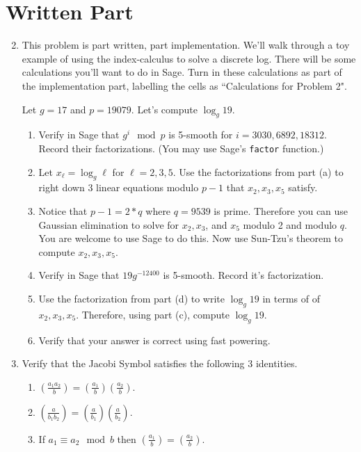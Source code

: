 \documentclass[11pt]{article}
\begin{document}
\section*{Written Part}
\begin{enumerate}
  \setcounter{enumi}{1}
  \item{
  This problem is part written, part implementation.  We'll walk through a toy example of using the index-calculus to solve a discrete log.  There will be some calculations you'll want to do in Sage.  Turn in these calculations as part of the implementation part, labelling the cells as ``Calculations for Problem 2".

  Let $g = 17$ and $p=19079$.  Let's compute $\log_g 19$.
  \begin{enumerate}
    \item{Verify in Sage that $g^i\mod p$ is 5-smooth for $i=3030,6892,18312$.  Record their factorizations.  (You may use Sage's \verb|factor| function.)}
    \item{Let $x_\ell = \log_g\ell$ for $\ell=2,3,5$.  Use the factorizations from part (a) to right down 3 linear equations modulo $p-1$ that $x_2,x_3,x_5$ satisfy.}
    \item{Notice that $p-1 = 2*q$ where $q = 9539$ is prime.  Therefore you can use Gaussian elimination to solve for $x_2,x_3$, and $x_5$ modulo 2 and modulo $q$.  You are welcome to use Sage to do this.  Now use Sun-Tzu's theorem to compute $x_2,x_3,x_5$.}
    \item{Verify in Sage that $19g^{-12400}$ is 5-smooth.  Record it's factorization.}
    \item{Use the factorization from part (d) to write $\log_g19$ in terms of of $x_2,x_3,x_5$.  Therefore, using part (c), compute $\log_g19$.}
    \item{Verify that your answer is correct using fast powering.}
  \end{enumerate}
  }
  \item{
  Verify that the Jacobi Symbol satisfies the following 3 identities.
  \begin{enumerate}
    \item{
    $\left(\frac{a_1a_2}{b}\right) = \left(\frac{a_1}{b}\right)\left(\frac{a_2}{b}\right).$
    }
    \item{
    $\left(\frac{a}{b_1b_2}\right) = \left(\frac{a}{b_1}\right)\left(\frac{a}{b_2}\right).$
    }
    \item{
    If $a_1\equiv a_2\mod b$ then $\left(\frac{a_1}{b}\right) = \left(\frac{a_2}{b}\right)$.
    }

\end{enumerate}}
\end{enumerate}
\end{document}

